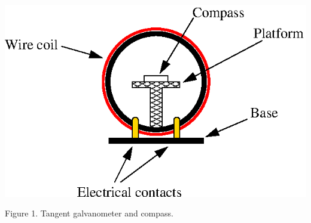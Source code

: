 \begin{center}
\includegraphics{tangent_galvanometer.eps}
\par
Figure 1. Tangent galvanometer and compass.
\end{center}

